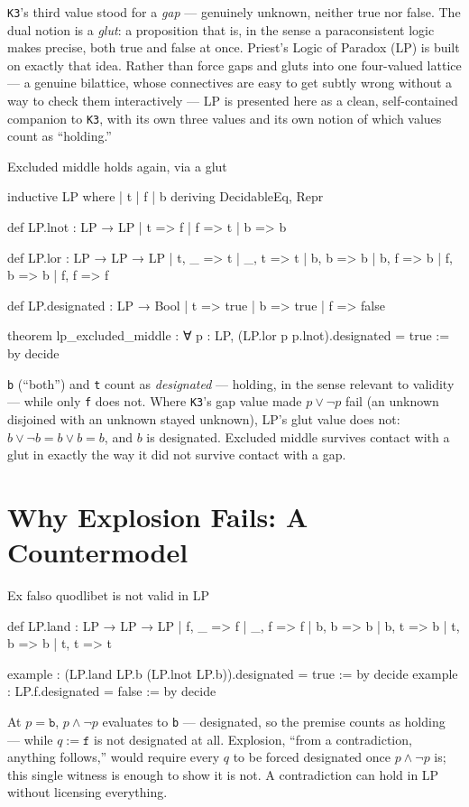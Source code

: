 \texttt{K3}'s third value stood for a \emph{gap} — genuinely
unknown, neither true nor false. The dual notion is a \emph{glut}: a
proposition that is, in the sense a paraconsistent logic makes
precise, both true and false at once. Priest's Logic of Paradox
(LP) is built on exactly that idea. Rather than force gaps and
gluts into one four-valued lattice — a genuine bilattice, whose
connectives are easy to get subtly wrong without a way to check
them interactively — LP is presented here as a clean, self-contained
companion to \texttt{K3}, with its own three values and its own
notion of which values count as ``holding.''

\begin{experiment}{Excluded middle holds again, via a glut}
\begin{lean}
inductive LP where
  | t | f | b
  deriving DecidableEq, Repr

def LP.lnot : LP → LP
  | t => f
  | f => t
  | b => b

def LP.lor : LP → LP → LP
  | t, _ => t
  | _, t => t
  | b, b => b
  | b, f => b
  | f, b => b
  | f, f => f

def LP.designated : LP → Bool
  | t => true
  | b => true
  | f => false

theorem lp_excluded_middle :
    ∀ p : LP, (LP.lor p p.lnot).designated = true := by decide
\end{lean}
\texttt{b} (``both'') and \texttt{t} count as \emph{designated} —
holding, in the sense relevant to validity — while only \texttt{f}
does not. Where \texttt{K3}'s gap value made $p \lor \lnot p$ fail
(an unknown disjoined with an unknown stayed unknown), LP's glut
value does not: $b \lor \lnot b = b \lor b = b$, and $b$ is
designated. Excluded middle survives contact with a glut in exactly
the way it did not survive contact with a gap.
\end{experiment}

\section{Why Explosion Fails: A Countermodel}

\begin{countermodel}{Ex falso quodlibet is not valid in LP}
\begin{lean}
def LP.land : LP → LP → LP
  | f, _ => f
  | _, f => f
  | b, b => b
  | b, t => b
  | t, b => b
  | t, t => t

example : (LP.land LP.b (LP.lnot LP.b)).designated = true := by decide
example : LP.f.designated = false := by decide
\end{lean}
At $p = \texttt{b}$, $p \land \lnot p$ evaluates to \texttt{b} —
designated, so the premise counts as holding — while $q := \texttt{f}$
is not designated at all. Explosion, ``from a contradiction, anything
follows,'' would require every $q$ to be forced designated once
$p \land \lnot p$ is; this single witness is enough to show it is
not. A contradiction can hold in LP without licensing everything.
\end{countermodel}

